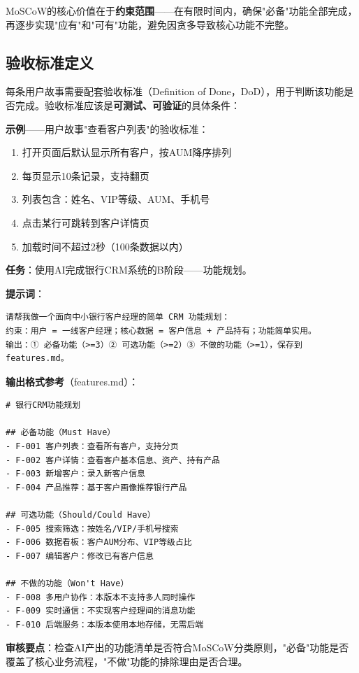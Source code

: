 MoSCoW的核心价值在于\textbf{约束范围}——在有限时间内，确保"必备"功能全部完成，再逐步实现"应有"和"可有"功能，避免因贪多导致核心功能不完整。

\subsection{验收标准定义}

每条用户故事需要配套验收标准（Definition of Done，DoD），用于判断该功能是否完成。验收标准应该是\textbf{可测试、可验证}的具体条件：

\textbf{示例}——用户故事"查看客户列表"的验收标准：
\begin{enumerate}[leftmargin=2em]
  \item 打开页面后默认显示所有客户，按AUM降序排列
  \item 每页显示10条记录，支持翻页
  \item 列表包含：姓名、VIP等级、AUM、手机号
  \item 点击某行可跳转到客户详情页
  \item 加载时间不超过2秒（100条数据以内）
\end{enumerate}

\begin{practicebox}[用AI做CRM功能规划]
\textbf{任务}：使用AI完成银行CRM系统的B阶段——功能规划。

\textbf{提示词}：

\begin{lstlisting}
请帮我做一个面向中小银行客户经理的简单 CRM 功能规划：
约束：用户 = 一线客户经理；核心数据 = 客户信息 + 产品持有；功能简单实用。
输出：① 必备功能（>=3）② 可选功能（>=2）③ 不做的功能（>=1），保存到 features.md。
\end{lstlisting}

\textbf{输出格式参考}（features.md）：

\begin{lstlisting}[style=markdown]
# 银行CRM功能规划

## 必备功能（Must Have）
- F-001 客户列表：查看所有客户，支持分页
- F-002 客户详情：查看客户基本信息、资产、持有产品
- F-003 新增客户：录入新客户信息
- F-004 产品推荐：基于客户画像推荐银行产品

## 可选功能（Should/Could Have）
- F-005 搜索筛选：按姓名/VIP/手机号搜索
- F-006 数据看板：客户AUM分布、VIP等级占比
- F-007 编辑客户：修改已有客户信息

## 不做的功能（Won't Have）
- F-008 多用户协作：本版本不支持多人同时操作
- F-009 实时通信：不实现客户经理间的消息功能
- F-010 后端服务：本版本使用本地存储，无需后端
\end{lstlisting}

\textbf{审核要点}：检查AI产出的功能清单是否符合MoSCoW分类原则，"必备"功能是否覆盖了核心业务流程，"不做"功能的排除理由是否合理。
\end{practicebox}

